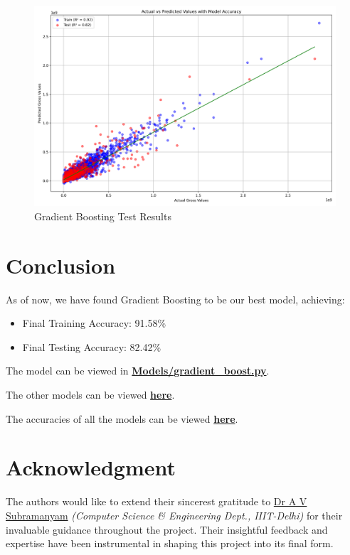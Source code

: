 \documentclass[conference]{IEEEtran}
\begin{document}
    \begin{figure}[h]
        \centering
        \includegraphics[width=1\linewidth]{model_accuracy_plot.png}
        \caption{Gradient Boosting Test Results}
        \label{fig:gradient_boosting_test}
    \end{figure}

\section{Conclusion}
    As of now, we have found Gradient Boosting to be our best model, achieving:
    
    \begin{itemize}
        \item Final Training Accuracy: 91.58\%
        \item Final Testing Accuracy: 82.42\%
    \end{itemize}
    
    The model can be viewed in \href{https://github.com/Vikranth3140/Movie-Revenue-Prediction/blob/main/models/gradient_boost.py}{\textbf{Models/gradient\_boost.py}}.
    
    The other models can be viewed \href{https://github.com/Vikranth3140/Movie-Revenue-Prediction/tree/main/models}{\textbf{here}}.
    
    The accuracies of all the models can be viewed \href{https://github.com/Vikranth3140/Movie-Revenue-Prediction/blob/main/models/accuracies.text}{\textbf{here}}.

\section*{Acknowledgment}
    The authors would like to extend their sincerest gratitude to \href{https://www.iiitd.ac.in/subramanyam}{Dr A V Subramanyam} \textit{(Computer Science \& Engineering Dept., IIIT-Delhi)} for their invaluable guidance throughout the project.
    Their insightful feedback and expertise have been instrumental in shaping this project into its final form.
\end{document}
